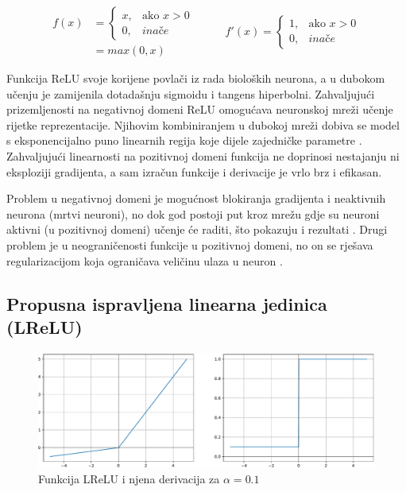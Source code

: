 \documentclass[times, utf8, numeric, diplomski]{fer}
\def\otherwise{\textit{inače}}
\begin{document}
\begin{equation}
\label{eq:relu}
\begin{split}
f(x) &= \begin{cases}
x,		& \text{ako } x > 0 \\
0,		& \otherwise
\end{cases} \\
&= max(0, x)
\end{split}
\qquad
\begin{split}
f'(x) = 
\begin{cases}
1,		& \text{ako } x > 0 \\
0,		& \otherwise
\end{cases}
\end{split}
\end{equation}

Funkcija ReLU svoje korijene povlači iz rada bioloških neurona, a u dubokom učenju je zamijenila dotadašnju sigmoidu i tangens hiperbolni. Zahvaljujući prizemljenosti na negativnoj domeni ReLU omogućava neuronskoj mreži učenje rijetke reprezentacije. Njihovim kombiniranjem u dubokoj mreži dobiva se model s eksponencijalno puno linearnih regija koje dijele zajedničke parametre \citep{relu_rbm}. Zahvaljujući linearnosti na pozitivnoj domeni funkcija ne doprinosi nestajanju ni eksploziji gradijenta, a sam izračun funkcije i derivacije je vrlo brz i efikasan. \citep{relu}

Problem u negativnoj domeni je mogućnost blokiranja gradijenta i neaktivnih neurona (mrtvi neuroni), no dok god postoji put kroz mrežu gdje su neuroni aktivni (u pozitivnoj domeni) učenje će raditi, što pokazuju i rezultati \citep{relu}. Drugi problem je u neograničenosti funkcije u pozitivnoj domeni, no on se rješava regularizacijom koja ograničava veličinu ulaza u neuron \citep{relu}.

\subsection{Propusna ispravljena linearna jedinica (LReLU)}

\begin{figure}[H]
\includegraphics[width=\textwidth]{LReLU.pdf}
\centering
\caption{Funkcija LReLU i njena derivacija za $\alpha=0.1$}
\label{fig:lrelu}
\end{figure}
\end{document}
